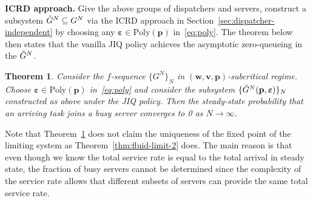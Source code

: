\documentclass[11pt, reqno]{article}
\newtheorem{theorem}{Theorem}
\numberwithin{equation}{section}
\numberwithin{theorem}{section}
\begin{document}
\noindent
\textbf{ICRD approach.}
Give the above groups of dispatchers and servers, construct a subsystem $\Tilde{G}^N\subseteq G^N$ via the ICRD approach in Section~\ref{sec:dispatcher-independent} by choosing any $\boldsymbol\varepsilon\in\mathrm{Poly}(\mathbf{p})$ in~\eqref{eq:poly}. %
The theorem below then states that the vanilla JIQ policy achieves the asymptotic zero-queueing in the $\Tilde{G}^N$. 

\begin{theorem}%
\label{thm:general-JIQ}
Consider the $f$-sequence $\{G^N\}_N$ in $(\mathbf{w},\mathbf{v},\mathbf{p})$-subcritical regime. 
Choose $\boldsymbol\varepsilon\in\mathrm{Poly}(\mathbf{p})$ in~\eqref{eq:poly}
and consider the subsystem $\{\Tilde{G}^N(\mathbf{p},\boldsymbol\varepsilon)\}_N$ constructed as above under the JIQ policy.
Then the steady-state probability that an arriving task joins a busy server converges to 0 as $N\to\infty$.
\end{theorem}
Note that Theorem~\ref{thm:general-JIQ} does not claim the uniqueness of the fixed point of the limiting system as Theorem~\ref{thm:fluid-limit-2} does. The main reason is that even though we know the total service rate is equal to the total arrival in steady state, the fraction of busy servers cannot be determined since the complexity of the service rate allows that different subsets of servers can provide the same total service rate.
\vspace{.2cm}
\end{document}
